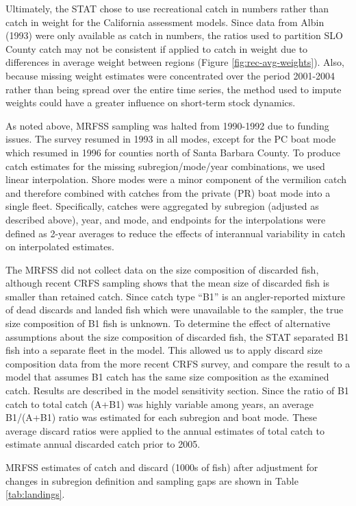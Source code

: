 \documentclass[
  english,
  a4paper,
]{article}
\begin{document}
Ultimately, the STAT chose to use recreational catch in numbers rather than
catch in weight for the California assessment models. Since data from
Albin (1993)
were only available as catch in numbers, the ratios used to partition SLO County
catch may not be consistent if applied to catch in weight due to differences in
average weight between regions (Figure \ref{fig:rec-avg-weights}). Also, because
missing weight estimates were concentrated over the period 2001-2004 rather than
being spread over the entire time series, the method used to impute weights could
have a greater influence on short-term stock dynamics.

As noted above, MRFSS sampling was halted from 1990-1992 due to funding issues.
The survey resumed in 1993 in all modes, except for the PC boat
mode which resumed in 1996 for counties north of Santa Barbara County. To
produce catch estimates for the missing subregion/mode/year combinations, we
used linear interpolation. Shore modes were a minor component of the vermilion
catch and therefore combined with catches from the private (PR) boat mode into
a single fleet. Specifically, catches were aggregated by subregion (adjusted as
described above), year, and mode, and endpoints for the interpolations were
defined as 2-year averages to reduce the effects of interannual variability
in catch on interpolated estimates.

The MRFSS did not collect data on the size composition of discarded fish,
although recent CRFS sampling shows that the mean size of discarded fish is
smaller than retained catch. Since catch type ``B1'' is an angler-reported mixture
of dead discards and landed fish which were unavailable to the sampler, the true
size composition of B1 fish is unknown. To determine the effect of alternative
assumptions about the size composition of discarded fish, the STAT separated B1
fish into a separate fleet in the model. This allowed us to apply discard size
composition data from the more recent CRFS survey, and compare the result to a
model that assumes B1 catch has the same size composition as the examined catch.
Results are described in the model sensitivity section. Since the ratio of B1
catch to total catch (A+B1) was highly variable among years, an average B1/(A+B1)
ratio was estimated for each subregion and boat mode. These average discard
ratios were applied to the annual estimates of total catch to estimate annual
discarded catch prior to 2005.

MRFSS estimates of catch and discard (1000s of fish) after adjustment for
changes in subregion definition and sampling gaps are shown in Table \ref{tab:landings}.
\end{document}
